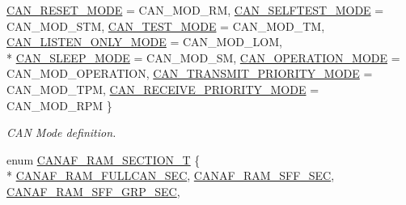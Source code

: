 \begin{DoxyCompactItemize}
\hyperlink{group__CAN__17XX__40XX_gga57c03b9f9b4ebf86dccc13baf8c2889ca398cd9777634ece5fcbab4df3cf3a526}{C\+A\+N\+\_\+\+R\+E\+S\+E\+T\+\_\+\+M\+O\+DE} = C\+A\+N\+\_\+\+M\+O\+D\+\_\+\+RM, 
\hyperlink{group__CAN__17XX__40XX_gga57c03b9f9b4ebf86dccc13baf8c2889cabdca353874fc8859b6d8d84fc8650b51}{C\+A\+N\+\_\+\+S\+E\+L\+F\+T\+E\+S\+T\+\_\+\+M\+O\+DE} = C\+A\+N\+\_\+\+M\+O\+D\+\_\+\+S\+TM, 
\hyperlink{group__CAN__17XX__40XX_gga57c03b9f9b4ebf86dccc13baf8c2889ca7a621122f70de0ed611cee6827ad05c9}{C\+A\+N\+\_\+\+T\+E\+S\+T\+\_\+\+M\+O\+DE} = C\+A\+N\+\_\+\+M\+O\+D\+\_\+\+TM, 
\hyperlink{group__CAN__17XX__40XX_gga57c03b9f9b4ebf86dccc13baf8c2889ca26235b6e55aa176156126830508fcf77}{C\+A\+N\+\_\+\+L\+I\+S\+T\+E\+N\+\_\+\+O\+N\+L\+Y\+\_\+\+M\+O\+DE} = C\+A\+N\+\_\+\+M\+O\+D\+\_\+\+L\+OM, 
\\*
\hyperlink{group__CAN__17XX__40XX_gga57c03b9f9b4ebf86dccc13baf8c2889cad4b949fba84b06206011287e25a69480}{C\+A\+N\+\_\+\+S\+L\+E\+E\+P\+\_\+\+M\+O\+DE} = C\+A\+N\+\_\+\+M\+O\+D\+\_\+\+SM, 
\hyperlink{group__CAN__17XX__40XX_gga57c03b9f9b4ebf86dccc13baf8c2889ca48f5ffda42c1bd17d9fcb26900b1ced6}{C\+A\+N\+\_\+\+O\+P\+E\+R\+A\+T\+I\+O\+N\+\_\+\+M\+O\+DE} = C\+A\+N\+\_\+\+M\+O\+D\+\_\+\+O\+P\+E\+R\+A\+T\+I\+ON, 
\hyperlink{group__CAN__17XX__40XX_gga57c03b9f9b4ebf86dccc13baf8c2889cab20dd6c22d6383a3957083cd10d9b80d}{C\+A\+N\+\_\+\+T\+R\+A\+N\+S\+M\+I\+T\+\_\+\+P\+R\+I\+O\+R\+I\+T\+Y\+\_\+\+M\+O\+DE} = C\+A\+N\+\_\+\+M\+O\+D\+\_\+\+T\+PM, 
\hyperlink{group__CAN__17XX__40XX_gga57c03b9f9b4ebf86dccc13baf8c2889ca962f843f0fbf8d8d8a79b12727742e08}{C\+A\+N\+\_\+\+R\+E\+C\+E\+I\+V\+E\+\_\+\+P\+R\+I\+O\+R\+I\+T\+Y\+\_\+\+M\+O\+DE} = C\+A\+N\+\_\+\+M\+O\+D\+\_\+\+R\+PM
 \}\begin{DoxyCompactList}\small\item\em C\+AN Mode definition. \end{DoxyCompactList}
\item 
enum \hyperlink{group__CAN__17XX__40XX_gaf0ae33e71a7acfc561972811aa1207e8}{C\+A\+N\+A\+F\+\_\+\+R\+A\+M\+\_\+\+S\+E\+C\+T\+I\+O\+N\+\_\+T} \{ \\*
\hyperlink{group__CAN__17XX__40XX_ggaf0ae33e71a7acfc561972811aa1207e8abe9837dc35bd06778ce14557fb60c0d6}{C\+A\+N\+A\+F\+\_\+\+R\+A\+M\+\_\+\+F\+U\+L\+L\+C\+A\+N\+\_\+\+S\+EC}, 
\hyperlink{group__CAN__17XX__40XX_ggaf0ae33e71a7acfc561972811aa1207e8a3fbfc3b49a65a73278b5fe4a392c38f7}{C\+A\+N\+A\+F\+\_\+\+R\+A\+M\+\_\+\+S\+F\+F\+\_\+\+S\+EC}, 
\hyperlink{group__CAN__17XX__40XX_ggaf0ae33e71a7acfc561972811aa1207e8a6f0abb002e71440f460a50f5d9a67af7}{C\+A\+N\+A\+F\+\_\+\+R\+A\+M\+\_\+\+S\+F\+F\+\_\+\+G\+R\+P\+\_\+\+S\+EC}, 

\end{DoxyCompactItemize}
